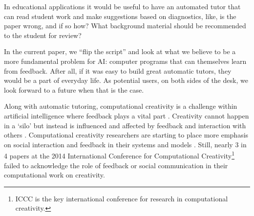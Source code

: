 %
%
%
%

%
%

In educational applications it would be useful to have an automated tutor that can read student work and make suggestions based on diagnostics, like, is the paper wrong, and if so how?  What background material should be recommended to the student for review?

In the current paper, we ``flip the script'' and look at what we believe to be a more fundamental problem for AI: computer programs that can themselves learn from feedback.  After all, if it was easy to build great automatic tutors, they would be a part of everyday life.  As potential users, on both sides of the desk, we look forward to a future when that is the case.

Along with automatic tutoring, computational creativity is a challenge within artificial intelligence where feedback plays a vital part \cite<for example>{perezyperez10MM,pease10}. Creativity cannot happen in a `silo' but instead is influenced and affected by feedback and interaction with others \cite{csik88,saunders2012towards}. Computational creativity researchers are starting to place more emphasis on social interaction and feedback in their systems and models \cite{saunders2012towards,gervas2014reading,corneli15iccc}. Still, nearly 3 in 4 papers at the 2014 International Conference for Computational Creativity\footnote{ICCC is  the key international conference for research in computational creativity.} failed to acknowledge the role of feedback or social communication in their computational work on creativity. 

